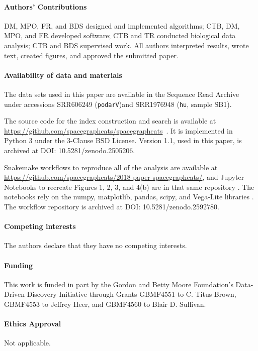 \documentclass[9pt,twocolumn,twoside,lineno]{pnas-new}
\theoremstyle{case}
\numberwithin{subcase}{case}
\begin{document}
\showacknow %

\paragraph{Authors’ Contributions}

DM, MPO, FR, and BDS designed and implemented algorithms; CTB, DM,
MPO, and FR developed software; CTB and TR conducted biological data
analysis; CTB and BDS supervised work. All authors interpreted
results, wrote text, created figures, and approved the submitted
paper.

\paragraph{Availability of data and materials}

The data sets used in this paper are available in the Sequence Read
Archive under accessions SRR606249 (\texttt{podarV})and SRR1976948
(\texttt{hu}, sample SB1).

The source code for the index construction and search is available at
\url{https://github.com/spacegraphcats/spacegraphcats}~\cite{spacegraphcats}.
It is implemented in Python 3 under the 3-Clause BSD License. Version 1.1, used in this paper, is archived at DOI: 10.5281/zenodo.2505206.

Snakemake \cite{snakemake} workflows to reproduce all of the analysis
are available at
\url{https://github.com/spacegraphcats/2018-paper-spacegraphcats/},
and Jupyter Notebooks to recreate Figures 1, 2, 3, and 4(b) are in
that same repository \cite{jupyter}. The notebooks rely on the numpy,
matplotlib, pandas, scipy, and Vega-Lite libraries
\cite{numpy,matplotlib,pandas,scipy,vegalite}. The workflow repository
is archived at DOI: 10.5281/zenodo.2592780.

\paragraph{Competing interests}

The authors declare that they have no competing interests.

\paragraph{Funding}

This work is funded in part by the Gordon and Betty Moore Foundation’s
Data-Driven Discovery Initiative through Grants GBMF4551 to C. Titus
Brown, GBMF4553 to Jeffrey Heer, and GBMF4560 to Blair D. Sullivan.

\paragraph{Ethics Approval}

Not applicable.




\newpage
\clearpage

\end{document}
